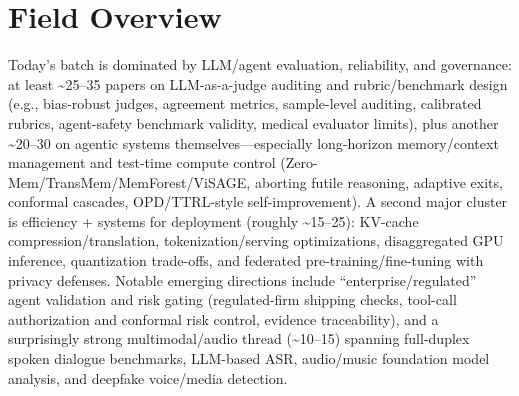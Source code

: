 \documentclass[12pt,letterpaper]{article}
\begin{document}
\medskip



\section*{Field Overview}
{\footnotesize Today's batch is dominated by LLM/agent evaluation, reliability, and governance: at least \textasciitilde{}25--35 papers on LLM-as-a-judge auditing and rubric/benchmark design (e.g., bias-robust judges, agreement metrics, sample-level auditing, calibrated rubrics, agent-safety benchmark validity, medical evaluator limits), plus another \textasciitilde{}20--30 on agentic systems themselves---especially long-horizon memory/context management and test-time compute control (Zero-Mem/TransMem/MemForest/ViSAGE, aborting futile reasoning, adaptive exits, conformal cascades, OPD/TTRL-style self-improvement). A second major cluster is efficiency + systems for deployment (roughly \textasciitilde{}15--25): KV-cache compression/translation, tokenization/serving optimizations, disaggregated GPU inference, quantization trade-offs, and federated pre-training/fine-tuning with privacy defenses. Notable emerging directions include ``enterprise/regulated'' agent validation and risk gating (regulated-firm shipping checks, tool-call authorization and conformal risk control, evidence traceability), and a surprisingly strong multimodal/audio thread (\textasciitilde{}10--15) spanning full-duplex spoken dialogue benchmarks, LLM-based ASR, audio/music foundation model analysis, and deepfake voice/media detection.}
\end{document}
